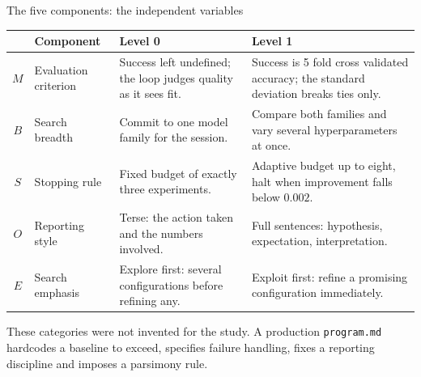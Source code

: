 \documentclass[aspectratio=169,11pt]{beamer}
\newcommand{\prog}{\texttt{program.md}}
\newcommand{\fnote}[1]{{\scriptsize\color{muted}#1}}
\begin{document}
\begin{frame}{The five components: the independent variables}
  \scriptsize
  \begin{tabular}{@{}clp{4.3cm}p{4.3cm}@{}}
    \toprule
    & \textbf{Component} & \textbf{Level 0} & \textbf{Level 1}\\
    \midrule
    $M$ & Evaluation criterion &
      Success left undefined; the loop judges quality as it sees fit. &
      Success is 5 fold cross validated accuracy; the standard deviation breaks
      ties only.\\[2pt]
    $B$ & Search breadth &
      Commit to one model family for the session. &
      Compare both families and vary several hyperparameters at once.\\[2pt]
    $S$ & Stopping rule &
      Fixed budget of exactly three experiments. &
      Adaptive budget up to eight, halt when improvement falls below $0.002$.\\[2pt]
    $O$ & Reporting style &
      Terse: the action taken and the numbers involved. &
      Full sentences: hypothesis, expectation, interpretation.\\[2pt]
    $E$ & Search emphasis &
      Explore first: several configurations before refining any. &
      Exploit first: refine a promising configuration immediately.\\
    \bottomrule
  \end{tabular}
  \vfill
  \fnote{These categories were not invented for the study. A production
        \texttt{\prog} hardcodes a baseline to exceed, specifies failure
        handling, fixes a reporting discipline and imposes a parsimony rule.}
\end{frame}
\end{document}
